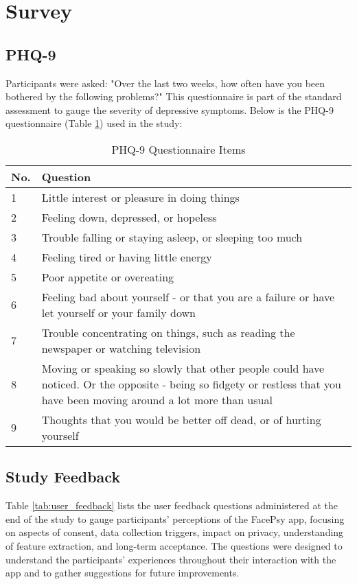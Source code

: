 \appendix

\section{Survey}

\subsection{PHQ-9}
Participants were asked: "Over the last two weeks, how often have you been bothered by the following problems?" This questionnaire is part of the standard assessment to gauge the severity of depressive symptoms. Below is the PHQ-9 questionnaire (Table \ref{tab:phq9}) used in the study:

\begin{table}[h]
\centering
\small
\caption{PHQ-9 Questionnaire Items}
\label{tab:phq9}
\begin{tabular}{>{\raggedright}p{0.5cm} >{\raggedright\arraybackslash}p{12cm}}
\toprule
\textbf{No.} & \textbf{Question} \\
\midrule
1 & Little interest or pleasure in doing things \\
2 & Feeling down, depressed, or hopeless \\
3 & Trouble falling or staying asleep, or sleeping too much \\
4 & Feeling tired or having little energy \\
5 & Poor appetite or overeating \\
6 & Feeling bad about yourself - or that you are a failure or have let yourself or your family down \\
7 & Trouble concentrating on things, such as reading the newspaper or watching television \\
8 & Moving or speaking so slowly that other people could have noticed. Or the opposite - being so fidgety or restless that you have been moving around a lot more than usual \\
9 & Thoughts that you would be better off dead, or of hurting yourself \\
\bottomrule
\end{tabular}
\end{table}

\subsection{Study Feedback} \label{A_Study_Feedback}
 Table \ref{tab:user_feedback} lists the user feedback questions administered at the end of the study to gauge participants' perceptions of the FacePsy app, focusing on aspects of consent, data collection triggers, impact on privacy, understanding of feature extraction, and long-term acceptance. The questions were designed to understand the participants' experiences throughout their interaction with the app and to gather suggestions for future improvements.

